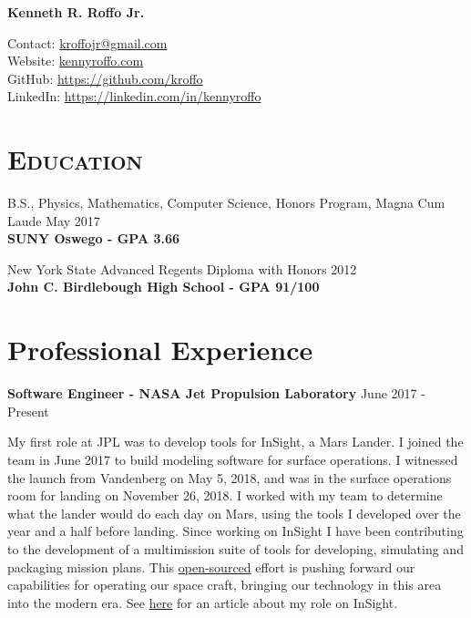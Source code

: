 \documentclass[8pt]{article}
\def\name{Kenneth R. Roffo Jr.}
\renewenvironment{itemize}{
  \begin{list}{}{
    \setlength{\leftmargin}{1.5em}
  }
}{
  \end{list}
}
\begin{document}
{\huge \bf \name}


Contact: \href{mailto:kroffojr@gmail.com}{kroffojr@gmail.com}\\
Website: \href{http://kennyroffo.com}{kennyroffo.com}\\
GitHub: \href{https://github.com/kroffo}{https://github.com/kroffo}\\
LinkedIn: \href{https://www.linkedin.com/in/kennyroffo}{https://linkedin.com/in/kennyroffo}

\section*{\textsc{Education}}

\begin{itemize}
  \item B.S., Physics, Mathematics, Computer Science, Honors Program, Magna Cum Laude \hfill May 2017\\
  \textbf{SUNY Oswego - GPA 3.66}
  \item New York State Advanced Regents Diploma with Honors \hfill 2012\\
  \textbf{John C. Birdlebough High School - GPA 91/100}
  \end{itemize}


\section*{Professional Experience}
\textbf{Software Engineer - NASA Jet Propulsion Laboratory} \hfill June 2017 - Present

My first role at JPL was to develop tools for InSight, a Mars Lander. I joined the team in June 2017 to build modeling software for surface operations. I witnessed the launch from Vandenberg on May 5, 2018, and was in the surface operations room for landing on November 26, 2018. I worked with my team to determine what the lander would do each day on Mars, using the tools I developed over the year and a half before landing. Since working on InSight I have been contributing to the development of a multimission suite of tools for developing, simulating and packaging mission plans. This \href{https://github.com/NASA-AMMOS/aerie}{open-sourced} effort is pushing forward our capabilities for operating our space craft, bringing our technology in this area into the modern era. See \href{http://www.oswegocountynewsnow.com/news/mars-landing-puts-phoenix-native-suny-oswego-grad-roffo-among/article_968bd574-f34c-11e8-8c5b-b7d557e9f682.html?fbclid=IwAR1iCW3CdQIRr2JIy1f96utXjzzidSJ6vA13jVgvkjKIU6PopaLHYkpbQrw}{here} for an article about my role on InSight.
\end{document}

